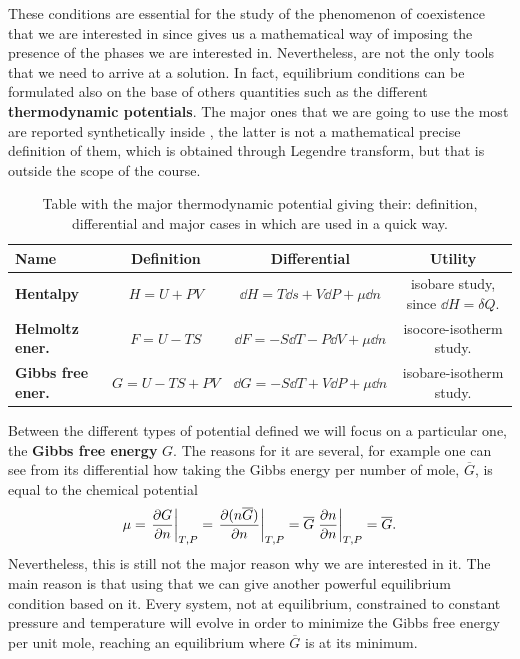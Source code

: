 These conditions are essential for the study of the phenomenon of coexistence that we are interested in since gives us a mathematical way of imposing the presence of the phases we are interested in. Nevertheless, are not the only tools that we need to arrive at a solution. In fact, equilibrium conditions can be formulated also on the base of others quantities such as the different \textbf{thermodynamic potentials}. The major ones that we are going to use the most are reported synthetically inside , the latter is not a mathematical precise definition of them, which is obtained through Legendre transform, but that is outside the scope of the course.
\begin{table}[t]
    \centering
    \caption{
        Table with the major thermodynamic potential giving their: definition, differential and major cases in which are used in a quick way.
    }
    \label{tab:thPot}
    \begin{tabular}{lccc}
        \toprule
        \toprule
        \textbf{Name} & \textbf{Definition} & \textbf{Differential} & \textbf{Utility}\\
        \midrule
        \textbf{Hentalpy} & $H = U + PV$ & $\dd H = T \dd s + V \dd P + \mu \dd n$ & isobare study, since $\dd H = \delta Q$.\\
        \textbf{Helmoltz ener.} & $F = U - TS$ & $\dd F = -S \dd T - P \dd V + \mu \dd n$ & isocore-isotherm study.\\
        \textbf{Gibbs free ener.} & $G = U - TS + PV$ & $\dd G = -S \dd T + V \dd P + \mu \dd n$ & isobare-isotherm study.\\
        \bottomrule
        \bottomrule
    \end{tabular}
\end{table}
Between the different types of potential defined we will focus on a particular one, the \textbf{Gibbs free energy} $G$. The reasons for it are several, for example one can see from its differential how taking the Gibbs energy per number of mole, $\overline{G}$, is equal to the chemical potential
\begin{equation}
    \mu = \eval{\pdv{G}{n}}_{T, P} = \eval{\pdv{(n\overline{G})}{n}}_{T, P} = \overline{G}\eval{\pdv{n}{n}}_{T, P} = \overline{G}. 
\end{equation}
Nevertheless, this is still not the major reason why we are interested in it. The main reason is that using that we can give another powerful equilibrium condition based on it.
{
    Every system, not at equilibrium, constrained to constant pressure and temperature will evolve in order to minimize the Gibbs free energy per unit mole, reaching an equilibrium where $\overline{G}$ is at its minimum.
}

